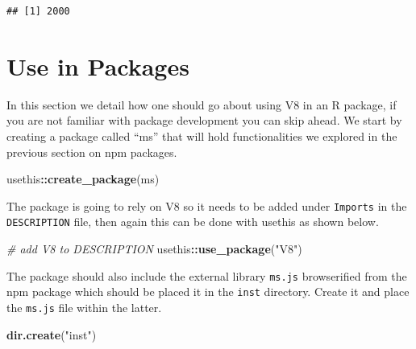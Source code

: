 \documentclass[
]{krantz}
\makeatletter
\newenvironment{Shaded}{\begin{snugshade}}{\end{snugshade}}
\newcommand{\CommentTok}[1]{\textcolor[rgb]{0.37,0.37,0.37}{\textit{#1}}}
\newcommand{\KeywordTok}[1]{\textcolor[rgb]{0.27,0.27,0.27}{\textbf{#1}}}
\newcommand{\NormalTok}[1]{#1}
\newcommand{\OperatorTok}[1]{\textcolor[rgb]{0.43,0.43,0.43}{\textbf{#1}}}
\newcommand{\StringTok}[1]{\textcolor[rgb]{0.5,0.5,0.5}{#1}}
\newenvironment{kframe}{%
\medskip{}
\setlength{\fboxsep}{.8em}
 \def\at@end@of@kframe{}%
 \ifinner\ifhmode%
  \def\at@end@of@kframe{\end{minipage}}%
  \begin{minipage}{\columnwidth}%
 \fi\fi%
 \def\FrameCommand##1{\hskip\@totalleftmargin \hskip-\fboxsep
 \colorbox{shadecolor}{##1}\hskip-\fboxsep
     \hskip-\linewidth \hskip-\@totalleftmargin \hskip\columnwidth}%
 \MakeFramed {\advance\hsize-\width
   \@totalleftmargin\z@ \linewidth\hsize
   \@setminipage}}%
 {\par\unskip\endMakeFramed%
 \at@end@of@kframe}
\renewenvironment{Shaded}{\begin{kframe}}{\end{kframe}}
\makeatother
\begin{document}
\begin{Shaded}
\end{Shaded}

\begin{verbatim}
## [1] 2000
\end{verbatim}

\hypertarget{v8-pkg}{%
\section{Use in Packages}\label{v8-pkg}}

In this section we detail how one should go about using V8 in an R package, if you are not familiar with package development you can skip ahead. We start by creating a package called ``ms'' that will hold functionalities we explored in the previous section on npm packages.

\begin{Shaded}
\begin{Highlighting}[]
\NormalTok{usethis}\OperatorTok{::}\KeywordTok{create\_package}\NormalTok{(}\StringTok{\textquotesingle{}ms\textquotesingle{}}\NormalTok{)}
\end{Highlighting}
\end{Shaded}

The package is going to rely on V8 so it needs to be added under \texttt{Imports} in the \texttt{DESCRIPTION} file, then again this can be done with usethis as shown below.

\begin{Shaded}
\begin{Highlighting}[]
\CommentTok{\# add V8 to DESCRIPTION}
\NormalTok{usethis}\OperatorTok{::}\KeywordTok{use\_package}\NormalTok{(}\StringTok{"V8"}\NormalTok{)}
\end{Highlighting}
\end{Shaded}

The package should also include the external library \texttt{ms.js} browserified from the npm package which should be placed it in the \texttt{inst} directory. Create it and place the \texttt{ms.js} file within the latter.

\begin{Shaded}
\begin{Highlighting}[]
\KeywordTok{dir.create}\NormalTok{(}\StringTok{"inst"}\NormalTok{)}
\end{Highlighting}
\end{Shaded}
\end{document}
